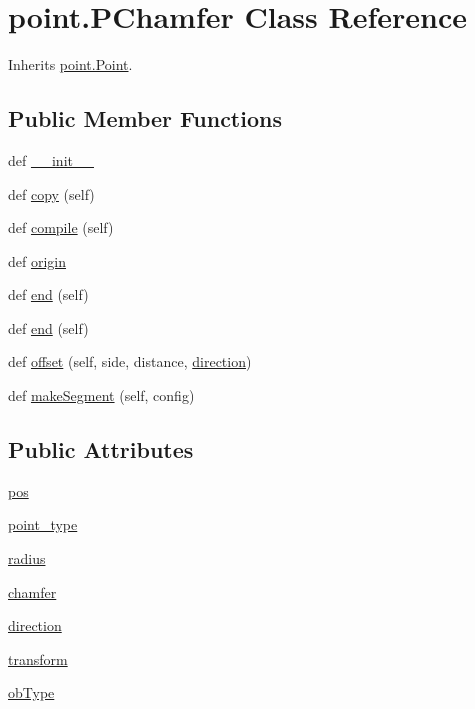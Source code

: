 \hypertarget{classpoint_1_1_p_chamfer}{}\section{point.\+P\+Chamfer Class Reference}
\label{classpoint_1_1_p_chamfer}


Inherits \hyperlink{classpoint_1_1_point}{point.\+Point}.

\subsection*{Public Member Functions}
\begin{DoxyCompactItemize}
\item 
def \hyperlink{classpoint_1_1_p_chamfer_a4bba2fa2dc6f83559b03789ca8603219}{\+\_\+\+\_\+init\+\_\+\+\_\+}
\item 
def \hyperlink{classpoint_1_1_p_chamfer_abcf4734fe9cae38b609ad10da6858962}{copy} (self)
\item 
def \hyperlink{classpoint_1_1_p_chamfer_a0a59e088c07825f5a93c4a6d3b712be9}{compile} (self)
\item 
def \hyperlink{classpoint_1_1_p_chamfer_a71c9d9ad7a2c417184332abc716abb26}{origin}
\item 
def \hyperlink{classpoint_1_1_p_chamfer_a9c47040298c0678743f359aff7222c17}{end} (self)
\item 
def \hyperlink{classpoint_1_1_p_chamfer_a9c47040298c0678743f359aff7222c17}{end} (self)
\item 
def \hyperlink{classpoint_1_1_p_chamfer_a19bfff02870c728f18607f0c29272bf7}{offset} (self, side, distance, \hyperlink{classpoint_1_1_p_chamfer_a6b0a4ae8c28eae281dfe12fc9cb824da}{direction})
\item 
def \hyperlink{classpoint_1_1_p_chamfer_a52d1f8529ce5dd22972de1d765933712}{make\+Segment} (self, config)
\end{DoxyCompactItemize}
\subsection*{Public Attributes}
\begin{DoxyCompactItemize}
\item 
\hyperlink{classpoint_1_1_p_chamfer_a0f21901746d56629b131bcf0ef83eafc}{pos}
\item 
\hyperlink{classpoint_1_1_p_chamfer_a1989aa77e716d9709f32e8f563aef107}{point\+\_\+type}
\item 
\hyperlink{classpoint_1_1_p_chamfer_ad4727d834ae92c5056267560f9a10819}{radius}
\item 
\hyperlink{classpoint_1_1_p_chamfer_a2bd9755b3bc6ea3f3742ae0191398d33}{chamfer}
\item 
\hyperlink{classpoint_1_1_p_chamfer_a6b0a4ae8c28eae281dfe12fc9cb824da}{direction}
\item 
\hyperlink{classpoint_1_1_p_chamfer_a7b0062591fb3f786a5a95cd9296645d1}{transform}
\item 
\hyperlink{classpoint_1_1_p_chamfer_aa9b5fa1686916ffc7c13e5db3fb47474}{ob\+Type}
\end{DoxyCompactItemize}


